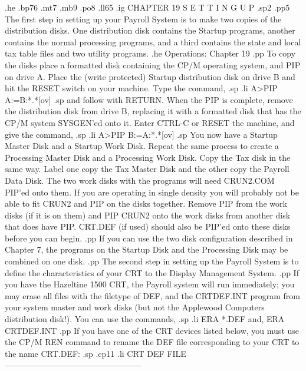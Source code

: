 .he
.bp76
.mt7
.mb9
.po8
.ll65
.ig
CHAPTER 19
S E T T I N G	 U P
.sp2
.pp5
The first step in setting up your Payroll System is to make
two copies of the distribution disks.
One distribution
disk contains the Startup programs, another contains the normal processing
programs, and a third contains the state and local tax table files and two
utility programs.
.he Operations: Chapter 19
.pp
To copy the disks
place a formatted disk containing the CP/M operating system,
and PIP
on drive A.  Place the (write protected) Startup distribution disk
on drive
B and hit the RESET switch on your machine.  Type the command,
.sp
.li
		A>PIP A:=B:*.*[ov]
.sp
and follow with RETURN.  When the PIP is complete, remove the distribution
disk from drive B, replacing it with a formatted disk that has the CP/M
system SYSGEN'ed onto it.
Enter CTRL-C or RESET the machine, and give
the command,
.sp
.li
		A>PIP B:=A:*.*[ov]
.sp
You now have a Startup Master Disk and a Startup Work Disk.  Repeat the
same process to create a Processing Master Disk and a Processing Work Disk.
Copy the Tax disk in the same way. Label one copy the Tax Master Disk and
the other copy the Payroll Data Disk.
The two work disks with the programs
will need CRUN2.COM PIP'ed onto them.  If you are operating
in single density you will probably not be able to fit CRUN2 and PIP on the
disks together.  Remove PIP from the work disks (if it is on them) and
PIP CRUN2 onto the work disks from another disk that does have PIP.  CRT.DEF
(if used) should also be PIP'ed onto these disks before you can begin.
.pp
If you can use the two disk configuration described in Chapter 7,
the programs on the Startup Disk and the Processing Disk may be combined
on one disk.
.pp
The second step in setting up the Payroll System is to define the
characteristics of your CRT to the Display Management System.
.pp
If you have the Hazeltine 1500 CRT, the Payroll system will run
immediately; you may erase all files with the filetype of DEF, and the
CRTDEF.INT program from your system master and work disks (but not the
Applewood Computers distribution disk!).  You can use the commands,
.sp
.li
		ERA *.DEF
	   and, ERA CRTDEF.INT
.pp
If you have one of the CRT devices listed below, you must use the CP/M
REN command to rename the DEF file corresponding to your CRT to the name
CRT.DEF:
.sp
.cp11
.li
       CRT			     DEF FILE
    --------------------------------------------------

